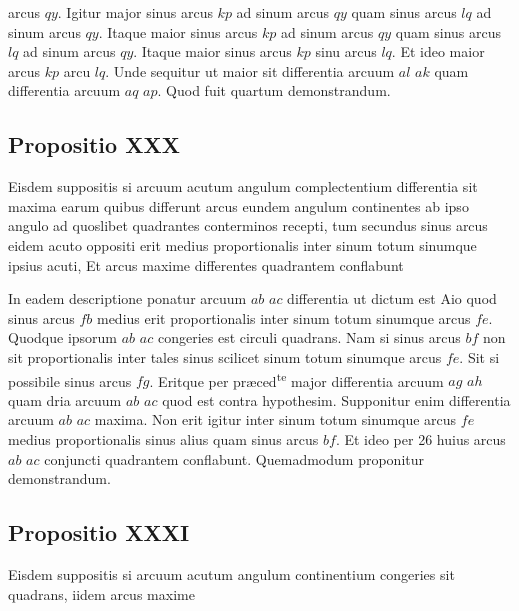 \documentclass[11pt,a4paper]{article}
\begin{document}
arcus $qy$. Igitur major sinus arcus $kp$ ad sinum arcus $qy$ quam sinus arcus $lq$ ad sinum arcus $qy$. Itaque maior sinus arcus $kp$ ad sinum arcus $qy$ quam sinus arcus $lq$ ad sinum arcus $qy$. Itaque maior sinus arcus $kp$ sinu arcus $lq$. Et ideo maior arcus $kp$ arcu $lq$. Unde sequitur ut maior sit differentia arcuum $al$ $ak$ quam differentia arcuum $aq$ $ap$. Quod fuit quartum demonstrandum.

\subsection*{Propositio XXX}

Eisdem suppositis si arcuum acutum angulum complectentium differentia sit maxima earum quibus differunt arcus eundem angulum continentes ab ipso angulo ad quoslibet quadrantes conterminos recepti, tum secundus sinus arcus eidem acuto oppositi erit medius proportionalis inter sinum totum sinumque ipsius acuti, Et arcus maxime differentes quadrantem conflabunt

In eadem descriptione ponatur arcuum $ab$ $ac$ differentia ut dictum est Aio quod sinus arcus $fb$ medius erit proportionalis inter sinum totum sinumque arcus $fe$. Quodque ipsorum $ab$ $ac$ congeries est circuli quadrans. Nam si sinus arcus $bf$ non sit  proportionalis inter tales sinus scilicet sinum totum sinumque arcus $fe$. Sit si possibile \struck{\ill{}} sinus arcus $fg$. Eritque per præced\textsuperscript{te} major differentia arcuum $ag$ $ah$ quam dria arcuum $ab$ $ac$ quod est contra hypothesim. Supponitur enim differentia arcuum $ab$ $ac$ maxima. Non erit igitur inter sinum totum sinumque arcus $fe$ medius proportionalis sinus alius quam sinus arcus $bf$. Et ideo per 26 huius arcus $ab$ $ac$ conjuncti quadrantem conflabunt. Quemadmodum proponitur demonstrandum.

\subsection*{Propositio XXXI}

Eisdem suppositis si arcuum acutum angulum continentium congeries sit quadrans, iidem arcus maxime 
\end{document}
